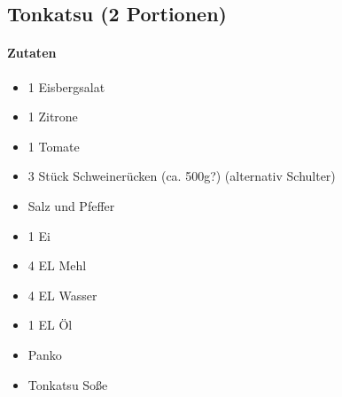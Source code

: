 \newpage
\subsection{Tonkatsu (2 Portionen)}
\paragraph{Zutaten}
\begin{itemize}[noitemsep]
	\item 1 Eisbergsalat
	\item 1 Zitrone
	\item 1 Tomate
	\item 3 Stück Schweinerücken (ca. 500g?) (alternativ Schulter)
	\item Salz und Pfeffer
	\item 1 Ei
	\item 4 EL Mehl
	\item 4 EL Wasser
	\item 1 EL Öl
	\item Panko
	\item Tonkatsu Soße
\end{itemize}


